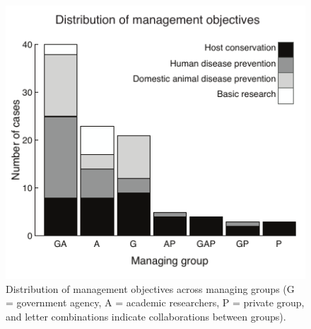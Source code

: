 \begin{figure}
	\caption[Management objectives reported in the wildlife disease management literature]{
	Distribution of management objectives across managing groups (G = government agency, A = academic researchers, P = private group, and letter combinations indicate collaborations between groups).
	}
    \begin{center}
	\includegraphics[width=150mm]{figs/ch1/WDMf1.pdf}
    \end{center}
\label{1-1}
\end{figure}

